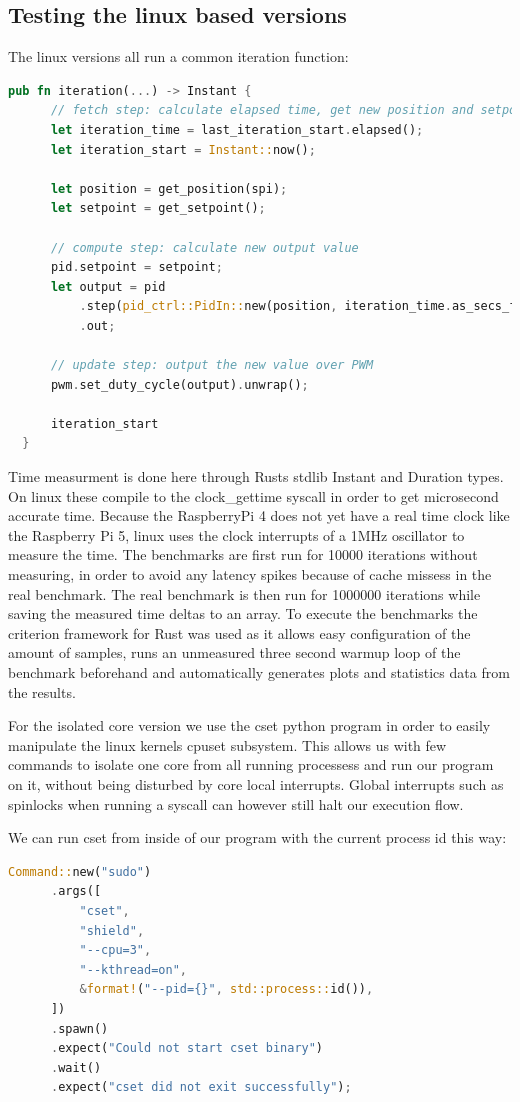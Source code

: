 \subsection{Testing the linux based versions}
The linux versions all run a common iteration function:
\begin{lstlisting}[language=Rust,style=colouredRust]
  pub fn iteration(...) -> Instant {
      // fetch step: calculate elapsed time, get new position and setpoint
      let iteration_time = last_iteration_start.elapsed();
      let iteration_start = Instant::now();
  
      let position = get_position(spi);
      let setpoint = get_setpoint();
  
      // compute step: calculate new output value
      pid.setpoint = setpoint;
      let output = pid
          .step(pid_ctrl::PidIn::new(position, iteration_time.as_secs_f64()))
          .out;
  
      // update step: output the new value over PWM
      pwm.set_duty_cycle(output).unwrap();
  
      iteration_start
  }
\end{lstlisting}

Time measurment is done here through Rusts stdlib Instant and Duration types.
On linux these compile to the clock\_gettime syscall in order to get microsecond accurate time.
Because the RaspberryPi 4 does not yet have a real time clock like the Raspberry Pi 5,
linux uses the clock interrupts of a 1MHz oscillator to measure the time.
The benchmarks are first run for 10000 iterations without measuring, in order to avoid any latency spikes because of cache missess in the real benchmark.
The real benchmark is then run for 1000000 iterations while saving the measured time deltas to an array.
To execute the benchmarks the criterion framework for Rust was used as it allows easy configuration of the amount of samples,
runs an unmeasured three second warmup loop of the benchmark beforehand and automatically generates plots and statistics data from the results.

For the isolated core version we use the cset python program in order to easily manipulate the linux kernels cpuset subsystem.
This allows us with few commands to isolate one core from all running processess and run our program on it, without being disturbed by core local interrupts.
Global interrupts such as spinlocks when running a syscall can however still halt our execution flow.

We can run cset from inside of our program with the current process id this way:
\begin{lstlisting}[language=Rust,style=colouredRust]
  Command::new("sudo")
      .args([
          "cset",
          "shield",
          "--cpu=3",
          "--kthread=on",
          &format!("--pid={}", std::process::id()),
      ])
      .spawn()
      .expect("Could not start cset binary")
      .wait()
      .expect("cset did not exit successfully");
\end{lstlisting}

